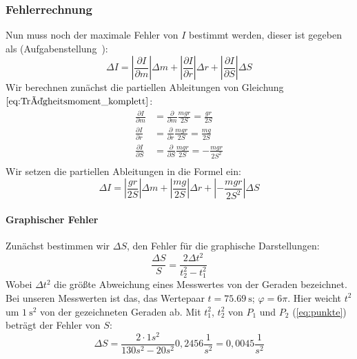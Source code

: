 \documentclass{article}
\begin{document}
			\subsubsection{Fehlerrechnung}
				Nun muss noch der maximale Fehler von \( I \) bestimmt werden, dieser ist gegeben als (Aufgabenstellung~\cite{AnleitungPraktikum}):
				\begin{equation}
					\Delta I = 
					\left| \frac{\partial I}{\partial m} \right| \Delta m +
					\left| \frac{\partial I}{\partial r} \right| \Delta r +
					\left| \frac{\partial I}{\partial S} \right| \Delta S
				\end{equation}
				Wir berechnen zunächst die partiellen Ableitungen von Gleichung \(\ref{eq:Trägheitsmoment_komplett}\):
				\begin{equation}
					\begin{aligned}
						\frac{\partial I}{\partial m} &= \frac{\partial}{\partial m} \frac{mgr}{2S} = \frac{gr}{2S} \\
						\frac{\partial I}{\partial r} &= \frac{\partial}{\partial r} \frac{mgr}{2S} = \frac{mg}{2S} \\
						\frac{\partial I}{\partial S} &= \frac{\partial}{\partial S} \frac{mgr}{2S} = -\frac{mgr}{2S^2} \\
					\end{aligned}
				\end{equation}
				Wir setzen die partiellen Ableitungen in die Formel ein:
				\begin{equation}
					\Delta I =
					\left| \frac{gr}{2S} \right| \Delta m +
					\left| \frac{mg}{2S} \right| \Delta r +
					\left| -\frac{mgr}{2S^2} \right| \Delta S
				\end{equation}

				\paragraph{Graphischer Fehler}
					Zunächst bestimmen wir \( \Delta S \), den Fehler für die graphische Darstellungen: %
					\begin{equation} %
						\frac{\Delta S}{S} = \frac{ 2 \Delta t^2 }{t^2_2 - t^2_1}
					\end{equation}
					Wobei \( \Delta t^2 \) die größte Abweichung eines Messwertes von der Geraden bezeichnet.
					Bei unseren Messwerten ist das, das Wertepaar \( t = \SI{75,69}{\second} \); \( \varphi = 6\pi \).
					Hier weicht \( t^2 \) um \( \SI{1}{\second^2} \) von der gezeichneten Geraden ab. %
					Mit \( t^2_1 \), \( t^2_2 \) von \( P_1 \) und \( P_2 \) (\ref{eq:punkte}) beträgt der Fehler von \( S \):
					\begin{equation}
						\Delta S = \frac{2\cdot 1s^2}{130s^2 - 20s^2}0,2456\frac{1}{s^2} = 0,0045\frac{1}{s^2}
					\end{equation}
				
\end{document}
